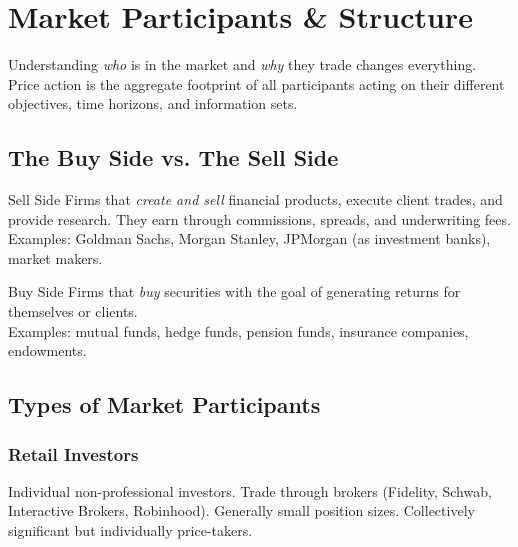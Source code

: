 
\chapter{Market Participants \& Structure}

\begin{notebox}
Understanding \emph{who} is in the market and \emph{why} they trade changes everything.
Price action is the aggregate footprint of all participants acting on their different
objectives, time horizons, and information sets.
\end{notebox}

\section{The Buy Side vs. The Sell Side}

\begin{keyterm}{Sell Side}
Firms that \emph{create and sell} financial products, execute client trades, and provide
research. They earn through commissions, spreads, and underwriting fees.\\
Examples: Goldman Sachs, Morgan Stanley, JPMorgan (as investment banks), market makers.
\end{keyterm}

\begin{keyterm}{Buy Side}
Firms that \emph{buy} securities with the goal of generating returns for themselves or clients.\\
Examples: mutual funds, hedge funds, pension funds, insurance companies, endowments.
\end{keyterm}

\section{Types of Market Participants}

\subsection{Retail Investors}
Individual non-professional investors. Trade through brokers (Fidelity, Schwab, Interactive
Brokers, Robinhood). Generally small position sizes. Collectively significant but individually
price-takers.

